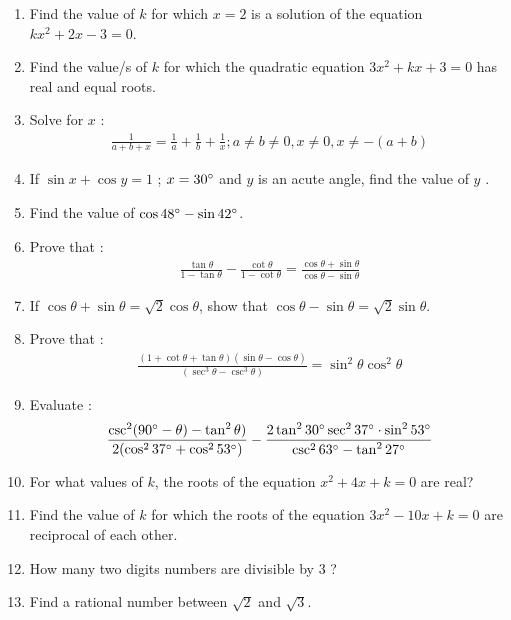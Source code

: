 \begin{enumerate}
\item Find the value of $k$ for which $x = 2$ is a solution of the equation
  $kx^2 + 2x - 3 = 0$.
  
\item Find the value/s of $k$ for which the quadratic equation $3x^{2} + kx + 3 = 0$
has real and equal roots.


\item Solve for $x$ :
\begin{align*}
    {\frac {1}{a+b+x}} = {\frac{1}{a}} + {\frac{1}{b}} + {\frac{1}{x}};  {a\neq b \neq 0},{x \neq 0},{x \neq -(a+b)}
\end{align*}

\item If $\sin{x} + \cos{y}= 1$ ; $x=30\degree$  and  $y$ is an acute angle, find the value of $y$ .

\item Find the value of $\cos {48\degree} - \sin {42\degree}$.

\item Prove that :
\begin{align*}
   {\frac{\tan\theta}{1-\tan\theta}} - {\frac{\cot\theta}{1-\cot\theta}}={\frac{\cos\theta+ \sin\theta}{\cos\theta-\sin\theta}}
\end{align*} 

\item If ${\cos\theta + \sin\theta} = {\sqrt 2}{\cos\theta}$, show that ${\cos\theta - \sin\theta} = {\sqrt 2}{\sin\theta}$.

\item Prove that :
\begin{align*}
    {\frac{(1+\cot\theta+\tan\theta)(\sin\theta-\cos\theta)}{(\sec^3\theta-\csc^3\theta)}} = \sin^2\theta \cos^2\theta
\end{align*}

\item Evaluate :
\begin{align*}
    {\frac{\csc^2(90\degree - \theta)-\tan^2\theta)}{2(\cos^2 37\degree + \cos^2 53\degree)}} - {\frac{2\tan^2 30\degree \sec^2 37\degree \cdot \sin^2 53\degree}{\csc^2 63\degree - \tan^2 27\degree}} 
\end{align*}	




\item For what values of $k$, the roots of the equation $x^2+4x+k = 0$ are real?
  \item Find the value of $k$ for which the roots of the equation $3x^2-10x+k=0$ are reciprocal of each other.
  \item How many two digits numbers are divisible by $3$ ?
  \item Find a rational number between $\sqrt{2}$ and $\sqrt{3}$.
  

\end{enumerate}
